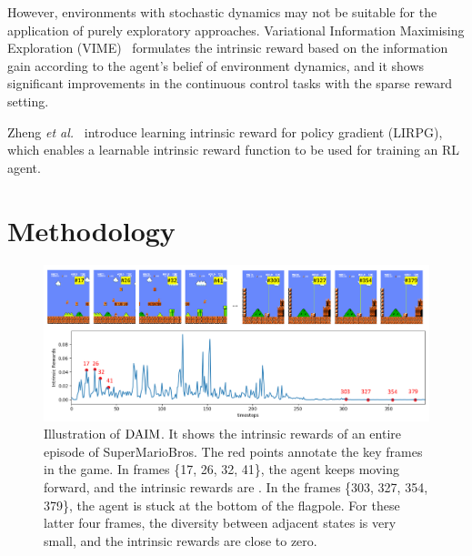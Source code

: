 However, environments with stochastic dynamics may not be suitable for the application of purely exploratory approaches. Variational Information Maximising Exploration (VIME)~\cite{NIPS2016_abd81528} formulates the intrinsic reward based on the information gain according to the agent’s belief of environment dynamics, and it shows significant improvements in the continuous control tasks with the sparse reward setting. 

Zheng \textit{et al.}~\cite{zheng2018learning} introduce learning intrinsic reward for policy gradient (LIRPG), which enables a learnable intrinsic reward function to be used for training an RL agent. 

\section{Methodology}
\begin{figure}[t]
    \centering
    \includegraphics[width=\linewidth]{figures/chapter5/illustration.pdf}
    \caption{Illustration of $\text{DAIM}$. It shows the intrinsic rewards of an entire episode of SuperMarioBros. The red points annotate the key frames in the game. In frames \{17, 26, 32, 41\}, the agent keeps moving forward, and the intrinsic rewards are . In the frames \{303, 327, 354, 379\}, the agent is stuck at the bottom of the flagpole. For these latter four frames, the diversity between adjacent states is very small, and the intrinsic rewards are close to zero.}
    \label{fig:illustration}
\end{figure}

